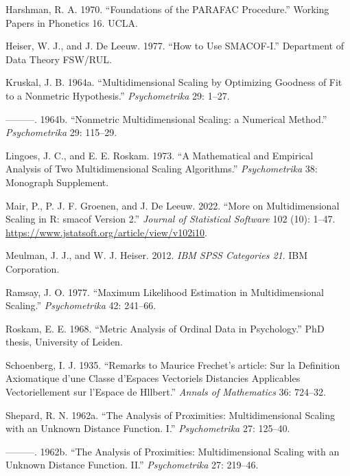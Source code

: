 \documentclass[
  12pt,
  letterpaper,
  DIV=11,
  numbers=noendperiod]{scrartcl}
\newlength{\cslhangindent}
\newenvironment{CSLReferences}[2] %
 {\begin{list}{}{%
  \setlength{\itemindent}{0pt}
  \setlength{\leftmargin}{0pt}
  \setlength{\parsep}{0pt}
  \ifodd #1
   \setlength{\leftmargin}{\cslhangindent}
   \setlength{\itemindent}{-1\cslhangindent}
  \fi
  \setlength{\itemsep}{#2\baselineskip}}}
 {\end{list}}
\begin{document}
\begin{CSLReferences}{1}{0}
Harshman, R. A. 1970. {``{Foundations of the PARAFAC Procedure}.''}
Working Papers in Phonetics 16. UCLA.

Heiser, W. J., and J. De Leeuw. 1977. {``How to Use {SMACOF-I}.''}
Department of Data Theory FSW/RUL.

Kruskal, J. B. 1964a. {``{Multidimensional Scaling by Optimizing
Goodness of Fit to a Nonmetric Hypothesis}.''} \emph{Psychometrika} 29:
1--27.

---------. 1964b. {``{Nonmetric Multidimensional Scaling: a Numerical
Method}.''} \emph{Psychometrika} 29: 115--29.

Lingoes, J. C., and E. E. Roskam. 1973. {``{A Mathematical and Empirical
Analysis of Two Multidimensional Scaling Algorithms}.''}
\emph{Psychometrika} 38: Monograph Supplement.

Mair, P., P. J. F. Groenen, and J. De Leeuw. 2022. {``{More on
Multidimensional Scaling in R: smacof Version 2}.''} \emph{Journal of
Statistical Software} 102 (10): 1--47.
\url{https://www.jstatsoft.org/article/view/v102i10}.

Meulman, J. J., and W. J. Heiser. 2012. \emph{IBM SPSS Categories 21}.
IBM Corporation.

Ramsay, J. O. 1977. {``{Maximum Likelihood Estimation in
Multidimensional Scaling}.''} \emph{Psychometrika} 42: 241--66.

Roskam, E. E. 1968. {``{Metric Analysis of Ordinal Data in
Psychology}.''} PhD thesis, University of Leiden.

Schoenberg, I. J. 1935. {``{Remarks to Maurice Frechet's article: Sur la
Definition Axiomatique d'une Classe d'Espaces Vectoriels Distancies
Applicables Vectoriellement sur l'Espace de Hllbert}.''} \emph{Annals of
Mathematics} 36: 724--32.

Shepard, R. N. 1962a. {``{The Analysis of Proximities: Multidimensional
Scaling with an Unknown Distance Function. I}.''} \emph{Psychometrika}
27: 125--40.

---------. 1962b. {``{The Analysis of Proximities: Multidimensional
Scaling with an Unknown Distance Function. II}.''} \emph{Psychometrika}
27: 219--46.


\end{CSLReferences}
\end{document}
